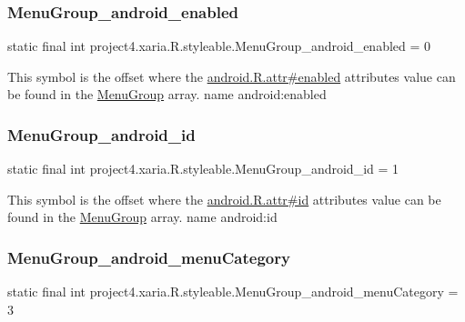 \subsubsection{\texorpdfstring{Menu\+Group\+\_\+android\+\_\+enabled}{MenuGroup\_android\_enabled}}
{\footnotesize\ttfamily static final int project4.\+xaria.\+R.\+styleable.\+Menu\+Group\+\_\+android\+\_\+enabled = 0\hspace{0.3cm}{\ttfamily [static]}}

This symbol is the offset where the \hyperlink{}{android.\+R.\+attr\#enabled} attribute\textquotesingle{}s value can be found in the \hyperlink{classproject4_1_1xaria_1_1R_1_1styleable_ae48043cd359a2d376fa65b4af13eca9a}{Menu\+Group} array.  name android\+:enabled \mbox{\label{classproject4_1_1xaria_1_1R_1_1styleable_a640dfef25dc9726381405f90ea7a87a2}} 
\subsubsection{\texorpdfstring{Menu\+Group\+\_\+android\+\_\+id}{MenuGroup\_android\_id}}
{\footnotesize\ttfamily static final int project4.\+xaria.\+R.\+styleable.\+Menu\+Group\+\_\+android\+\_\+id = 1\hspace{0.3cm}{\ttfamily [static]}}

This symbol is the offset where the \hyperlink{}{android.\+R.\+attr\#id} attribute\textquotesingle{}s value can be found in the \hyperlink{classproject4_1_1xaria_1_1R_1_1styleable_ae48043cd359a2d376fa65b4af13eca9a}{Menu\+Group} array.  name android\+:id \mbox{\label{classproject4_1_1xaria_1_1R_1_1styleable_aead14cbe860986024e8f6cbd4d09655a}} 
\subsubsection{\texorpdfstring{Menu\+Group\+\_\+android\+\_\+menu\+Category}{MenuGroup\_android\_menuCategory}}
{\footnotesize\ttfamily static final int project4.\+xaria.\+R.\+styleable.\+Menu\+Group\+\_\+android\+\_\+menu\+Category = 3\hspace{0.3cm}{\ttfamily [static]}}

